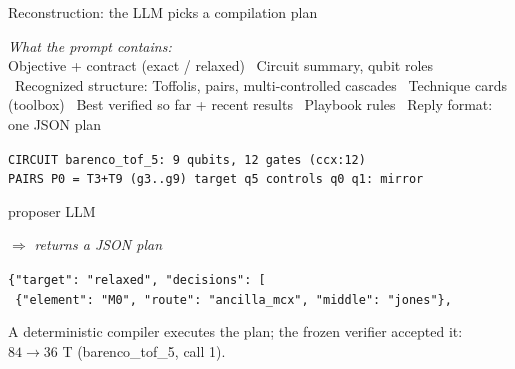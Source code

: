 \documentclass[10pt]{beamer}
\begin{document}
\begin{frame}{Reconstruction: the LLM picks a compilation plan}

{\footnotesize\itshape What the prompt contains:}\\[1pt]
{\scriptsize Objective + contract (exact / relaxed) \textbullet\ Circuit summary, qubit roles \textbullet\ Recognized structure: Toffolis, pairs, multi-controlled cascades \textbullet\ Technique cards (toolbox) \textbullet\ Best verified so far + recent results \textbullet\ Playbook rules \textbullet\ Reply format: one JSON plan}

\vspace{0.2cm}
\colorbox{blue!7}{\parbox{0.97\linewidth}{\scriptsize \texttt{CIRCUIT barenco\_tof\_5: 9 qubits, 12 gates (ccx:12)}\\\texttt{PAIRS  P0 = T3+T9 (g3..g9) target q5 controls q0 q1: mirror}}}

\vspace{0.35cm}
\begin{center}
\colorbox{orange!16}{\parbox{2.8cm}{\centering\normalsize proposer LLM}}
\qquad$\Longrightarrow$\qquad
{\scriptsize\itshape returns a JSON plan}
\end{center}

\vspace{0.35cm}
\colorbox{blue!7}{\parbox{0.97\linewidth}{\scriptsize \texttt{\{"target": "relaxed", "decisions": [}\\\texttt{  \{"element": "M0", "route": "ancilla\_mcx", "middle": "jones"\},}}}

\vspace{0.25cm}
\raggedright\footnotesize
A deterministic compiler executes the plan; the frozen verifier accepted it: $84 \to 36$ T (barenco\_tof\_5, call 1).

\end{frame}
\end{document}
